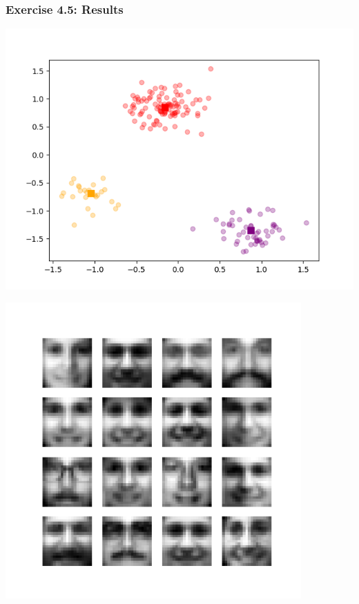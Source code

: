 \documentclass[10pt,aspectratio=169,handout]{beamer}
\begin{document}
\begin{frame}
    \frametitle{Exercise 4.5: Results}

    \begin{minipage}{0.49\textwidth}
        \includegraphics[width=\textwidth]{images/blob_4_5.png}
    \end{minipage}
    \begin{minipage}{0.49\textwidth}
        \includegraphics[width=0.85\textwidth]{images/faces_4_5.png}
    \end{minipage}
   

\end{frame}
\end{document}
